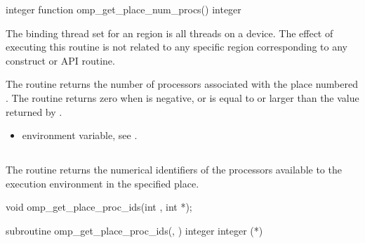 \begin{fortranspecific}
\begin{boxedcode}
integer function omp\_get\_place\_num\_procs()
integer 
\end{boxedcode}
\end{fortranspecific}

\binding
The binding thread set for an   region is all threads on a device. The effect of executing this routine is not related to any specific region corresponding to any construct or API routine.

\effect
The  routine returns the number of 
processors associated with the place numbered . The 
routine returns zero when  is negative, or is equal 
to or larger than the value returned by . 

\crossreferences
\begin{itemize}
\item {} environment variable, see 
.
\end{itemize}




\subsection{}
\label{subsec:omp_get_place_proc_ids}

\summary
The  routine returns the numerical identifiers of the processors available to the execution environment in the specified place.

\format
\begin{ccppspecific}
\begin{boxedcode}
void omp\_get\_place\_proc\_ids(int , int *);
\end{boxedcode}
\end{ccppspecific}

\begin{fortranspecific}
\begin{boxedcode}
subroutine omp\_get\_place\_proc\_ids(, )
integer 
integer (*)
\end{boxedcode}
\end{fortranspecific}

